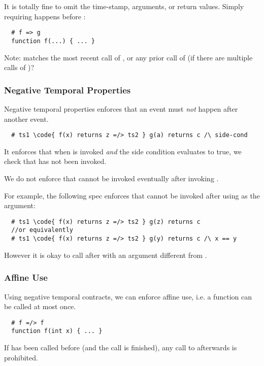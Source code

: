 It is totally fine to omit the time-stamp, arguments, or return values.
Simply requiring  happens before :
\begin{lstlisting}
  # f => g
  function f(...) { ... }
\end{lstlisting}


Note:  matches the most recent call of ,
or any prior call of  (if there are multiple calls of )?



\subsubsection{Negative Temporal Properties}

Negative temporal properties enforces that an event must \emph{not}
happen after another event.

\begin{lstlisting}
  # ts1 \code{ f(x) returns z =/> ts2 } g(a) returns c /\ side-cond
\end{lstlisting}
It enforces that when  is invoked \emph{and} the side condition
evaluates to true, we check that  has not been invoked.

We do not enforce that  cannot be invoked eventually
after invoking .

For example, the following spec enforces that  cannot be
invoked after  using  as the argument:
\begin{lstlisting}
  # ts1 \code{ f(x) returns z =/> ts2 } g(z) returns c
  //or equivalently
  # ts1 \code{ f(x) returns z =/> ts2 } g(y) returns c /\ x == y
\end{lstlisting}
However it is okay to call  after  with an argument different from .

\subsubsection*{Affine Use}

Using negative temporal contracts, we can enforce affine use, i.e.
a function can be called at most once.
\begin{lstlisting}
  # f =/> f
  function f(int x) { ... }
\end{lstlisting}
If  has been called before (and the call is finished), any
call to  afterwards is prohibited.

